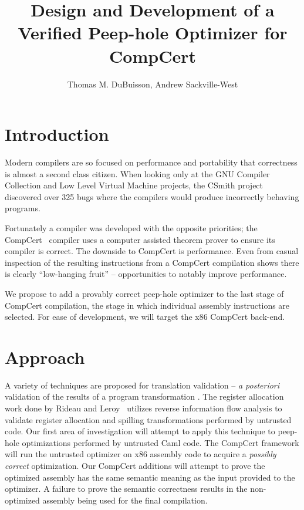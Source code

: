 \documentclass{exam}
\begin{document}
\title{Design and Development of a Verified Peep-hole Optimizer for CompCert}

\author{Thomas M. Du{B}uisson, Andrew Sackville-West}
\maketitle

\section{Introduction}
Modern compilers are so focused on performance and portability that
correctness is almost a second class citizen.  When looking only at
the GNU Compiler Collection and Low Level Virtual Machine projects,
the CSmith project~\cite{Yang11} discovered over 325 bugs where the
compilers would produce incorrectly behaving programs.

Fortunately a compiler was developed with the opposite priorities; the
CompCert~\cite{Leroy-backend} compiler uses a computer assisted theorem
prover to ensure its compiler is correct.  The downside to CompCert is
performance.  Even from casual inspection of the resulting
instructions from a CompCert compilation shows there is clearly
``low-hanging fruit'' -- opportunities to notably improve performance.

We propose to add a provably correct peep-hole optimizer to the last
stage of CompCert compilation, the stage in which individual assembly
instructions are selected.  For ease of development, we will target
the x86 CompCert back-end.

\section{Approach}

A variety of techniques are proposed for translation validation --
{\it a posteriori} validation of the results of a program
transformation \cite{2008-Tristan-Leroy-POPL}. The register allocation work done by
Rideau and Leroy~\cite{Rideau-Leroy-regalloc} utilizes reverse information flow
analysis to validate register allocation and spilling transformations
performed by untrusted code. Our first area of investigation will
attempt to apply this technique to peep-hole optimizations performed
by untrusted Caml code.  The CompCert framework will run the untrusted
optimizer on x86 assembly code to acquire a {\it possibly correct}
optimization.  Our CompCert additions will attempt to prove the
optimized assembly has the same semantic meaning as the input provided
to the optimizer.  A failure to prove the semantic correctness results
in the non-optimized assembly being used for the final compilation.
\end{document}
